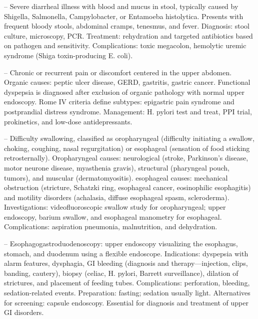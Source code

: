 -- Severe diarrheal illness with blood and mucus in stool, typically caused by Shigella, Salmonella, Campylobacter, or Entamoeba histolytica. Presents with frequent bloody stools, abdominal cramps, tenesmus, and fever. Diagnosis: stool culture, microscopy, PCR. Treatment: rehydration and targeted antibiotics based on pathogen and sensitivity. Complications: toxic megacolon, hemolytic uremic syndrome (Shiga toxin-producing E. coli).

-- Chronic or recurrent pain or discomfort centered in the upper abdomen. Organic causes: peptic ulcer disease, GERD, gastritis, gastric cancer. Functional dyspepsia is diagnosed after exclusion of organic pathology with normal upper endoscopy. Rome IV criteria define subtypes: epigastric pain syndrome and postprandial distress syndrome. Management: H. pylori test and treat, PPI trial, prokinetics, and low-dose antidepressants.

-- Difficulty swallowing, classified as oropharyngeal (difficulty initiating a swallow, choking, coughing, nasal regurgitation) or esophageal (sensation of food sticking retrosternally). Oropharyngeal causes: neurological (stroke, Parkinson's disease, motor neurone disease, myasthenia gravis), structural (pharyngeal pouch, tumors), and muscular (dermatomyositis). esophageal causes: mechanical obstruction (stricture, Schatzki ring, esophageal cancer, eosinophilic esophagitis) and motility disorders (achalasia, diffuse esophageal spasm, scleroderma). Investigations: videofluoroscopic swallow study for oropharyngeal; upper endoscopy, barium swallow, and esophageal manometry for esophageal. Complications: aspiration pneumonia, malnutrition, and dehydration.

-- Esophagogastroduodenoscopy: upper endoscopy visualizing the esophagus, stomach, and duodenum using a flexible endoscope. Indications: dyspepsia with alarm features, dysphagia, GI bleeding (diagnosis and therapy—injection, clips, banding, cautery), biopsy (celiac, H. pylori, Barrett surveillance), dilation of strictures, and placement of feeding tubes. Complications: perforation, bleeding, sedation-related events. Preparation: fasting; sedation usually light. Alternatives for screening: capsule endoscopy. Essential for diagnosis and treatment of upper GI disorders.

